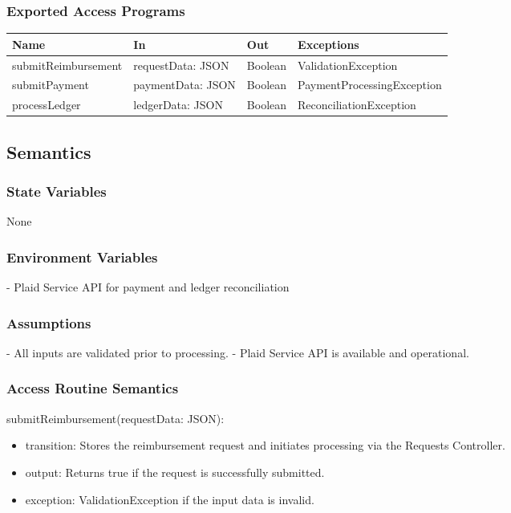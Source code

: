 \documentclass[12pt, titlepage]{article}
\begin{document}
\subsubsection{Exported Access Programs}
\begin{center}
\begin{tabular}{p{4cm} p{4cm} p{4cm} p{2cm}}
\hline
\textbf{Name} & \textbf{In} & \textbf{Out} & \textbf{Exceptions} \\
\hline
submitReimbursement & requestData: JSON & Boolean & ValidationException \\
submitPayment & paymentData: JSON & Boolean & PaymentProcessingException \\
processLedger & ledgerData: JSON & Boolean & ReconciliationException \\
\hline
\end{tabular}
\end{center}

\subsection{Semantics}

\subsubsection{State Variables}
None

\subsubsection{Environment Variables}
- Plaid Service API for payment and ledger reconciliation

\subsubsection{Assumptions}
- All inputs are validated prior to processing.
- Plaid Service API is available and operational.

\subsubsection{Access Routine Semantics}
\noindent submitReimbursement(requestData: JSON):
\begin{itemize}
\item transition: Stores the reimbursement request and initiates processing via the Requests Controller.
\item output: Returns true if the request is successfully submitted.
\item exception: ValidationException if the input data is invalid.
\end{itemize}
\end{document}
